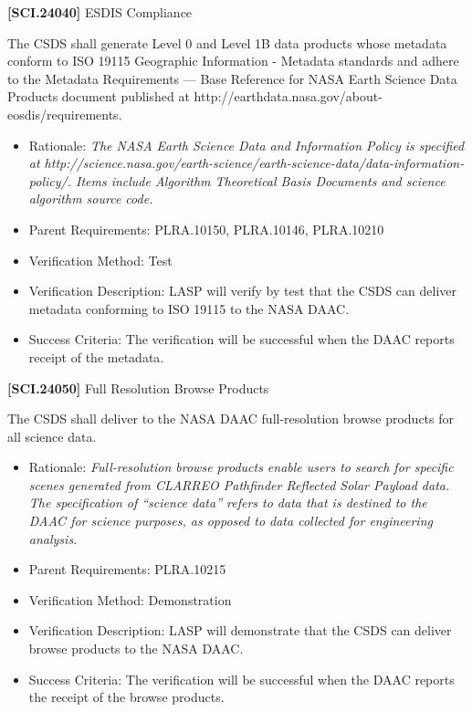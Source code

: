 \textbf{[SCI.24040]} \gls{ESDIS} Compliance

The \gls{CSDS} shall generate Level 0 and Level 1B data products whose metadata conform to ISO 19115 Geographic Information - Metadata standards and adhere to the Metadata Requirements --- Base Reference for NASA Earth Science Data Products document published at http:\slash \slash earthdata.nasa.gov\slash about-eosdis\slash requirements.

\begin{itemize}
\item{} Rationale: \emph{The NASA Earth Science Data and Information Policy is specified at http:\slash \slash science.nasa.gov\slash earth-science\slash earth-science-data\slash data-information-policy\slash . Items include Algorithm Theoretical Basis Documents and science algorithm source code.}

\item{} Parent Requirements: PLRA.10150, PLRA.10146, PLRA.10210

\item{} Verification Method: Test

\item{} Verification Description: \gls{LASP} will verify by \gls{test} that the \gls{CSDS} can deliver metadata conforming to ISO 19115 to the NASA \gls{DAAC}.

\item{} Success Criteria: The verification will be successful when the \gls{DAAC} reports receipt of the metadata.

\end{itemize}

\textbf{[SCI.24050]} Full Resolution Browse Products

The \gls{CSDS} shall deliver to the NASA \gls{DAAC} full-resolution browse products for all science data.

\begin{itemize}
\item{} Rationale: \emph{Full-resolution browse products enable users to search for specific scenes generated from CLARREO Pathfinder Reflected Solar Payload data. The specification of ``science data'' refers to data that is destined to the DAAC for science purposes, as opposed to data collected for engineering analysis.}

\item{} Parent Requirements: PLRA.10215

\item{} Verification Method: Demonstration

\item{} Verification Description: \gls{LASP} will demonstrate that the \gls{CSDS} can deliver browse products to the NASA \gls{DAAC}.

\item{} Success Criteria: The verification will be successful when the \gls{DAAC} reports the receipt of the browse products.

\end{itemize}


